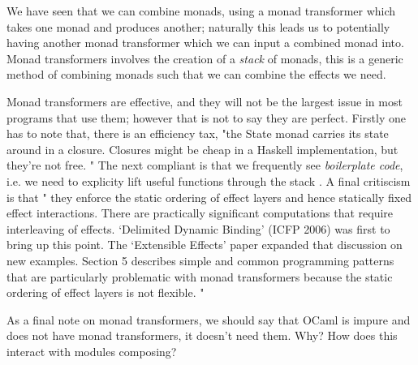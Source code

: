 We have seen that we can combine monads,
using a monad transformer which takes one monad
and produces another;
naturally this leads us to potentially
having another monad transformer which we can input
a combined monad into.
Monad transformers involves
the creation of a \textit{stack} of monads,
this is a generic method of combining monads
such that we can combine the effects we need.

Monad transformers are effective,
and they will not be the largest issue in most programs
that use them;
however that is not to say they are perfect.
Firstly one has to note that, there is an efficiency tax,
"the State monad carries its state around in a closure.
Closures might be cheap in a Haskell implementation, but they're not free.
"\cite{o2008real}
The next compliant is that we frequently see \textit{boilerplate code},
i.e. we need to explicity lift useful functions through the stack
\cite{kammar2013handlers}.
A final critiscism is that
"
they enforce the static ordering of effect layers and hence statically fixed effect interactions.
There are practically significant computations that require interleaving of effects.
‘Delimited Dynamic Binding’ (ICFP 2006) was first to bring up this point.
The ‘Extensible Effects’ paper expanded that discussion on new examples.
Section 5 describes simple and common programming patterns that are particularly
problematic with monad transformers because the static ordering of effect layers is not flexible.
"

As a final note on monad transformers,
we should say that OCaml is impure and does not have monad transformers,
it doesn't need them.
Why?
How does this interact with modules composing?

